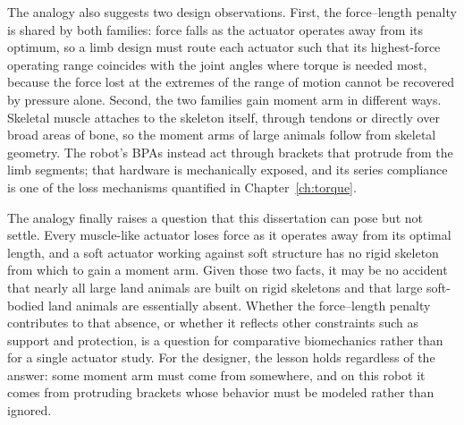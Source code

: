 The analogy also suggests two design observations. First, the force--length penalty is shared by both families: force falls as the actuator operates away from its optimum, so a limb design must route each actuator such that its highest-force operating range coincides with the joint angles where torque is needed most, because the force lost at the extremes of the range of motion cannot be recovered by pressure alone. Second, the two families gain moment arm in different ways. Skeletal muscle attaches to the skeleton itself, through tendons or directly over broad areas of bone, so the moment arms of large animals follow from skeletal geometry. The robot's BPAs instead act through brackets that protrude from the limb segments; that hardware is mechanically exposed, and its series compliance is one of the loss mechanisms quantified in Chapter~\ref{ch:torque}.

The analogy finally raises a question that this dissertation can pose but not settle. Every muscle-like actuator loses force as it operates away from its optimal length, and a soft actuator working against soft structure has no rigid skeleton from which to gain a moment arm. Given those two facts, it may be no accident that nearly all large land animals are built on rigid skeletons and that large soft-bodied land animals are essentially absent. Whether the force--length penalty contributes to that absence, or whether it reflects other constraints such as support and protection, is a question for comparative biomechanics rather than for a single actuator study. For the designer, the lesson holds regardless of the answer: some moment arm must come from somewhere, and on this robot it comes from protruding brackets whose behavior must be modeled rather than ignored.

